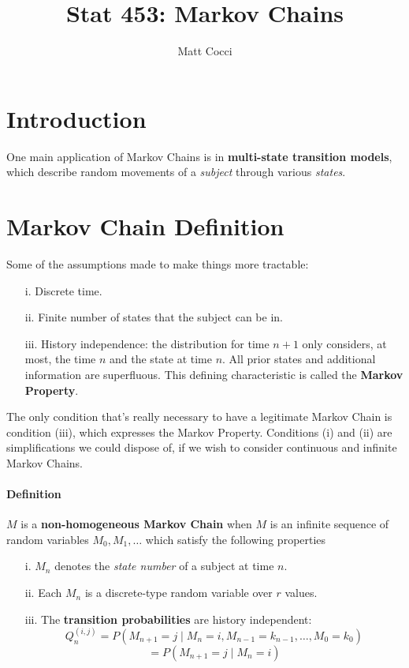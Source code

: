 \documentclass[a4paper,12pt]{scrartcl}
\author{Matt Cocci}
\title{Stat 453: Markov Chains}
\begin{document}
\maketitle

\section{Introduction}

One main application of Markov Chains is in \textbf{multi-state 
transition models}, which describe random movements of a \emph{subject}
through various \emph{states}.  

\section{Markov Chain Definition}

Some of the assumptions made to make things more tractable:
\begin{enumerate}
   \item[i.]{Discrete time.}
   \item[ii.]{Finite number of states that the subject can be in.}
   \item[iii.]{History independence: the distribution for time $n+1$
      only considers, at most, the time $n$ and the state at time $n$.
      All prior states and additional information are superfluous. 
      This defining characteristic is called the \textbf{Markov
      Property}.}
\end{enumerate}
The only condition that's really necessary to have a legitimate 
Markov Chain is condition (iii), which expresses the Markov Property.
Conditions (i) and (ii) are simplifications we could dispose of, if
we wish to consider continuous and infinite Markov Chains.

\paragraph{Definition} $M$ is a \textbf{non-homogeneous Markov Chain}
when $M$ is an infinite sequence of random variables $M_0, M_1,\ldots$
which satisfy the following properties
\begin{enumerate}
   \item[i.]{$M_n$ denotes the \emph{state number} of a subject at time
      $n$.}
   \item[ii.]{Each $M_n$ is a discrete-type random variable over $r$
      values.}
   \item[iii.]{The \textbf{transition probabilities} are history
      independent:
      \[ Q_n^{(i,j)} = P( M_{n+1}=j \; | \; M_n = i, M_{n-1}=k_{n-1},
	 \ldots , M_0 = k_0 ) \]
      \[ =P(M_{n+1} = j \; | \; M_n = i ) \]
      }
\end{enumerate}
\end{document}
